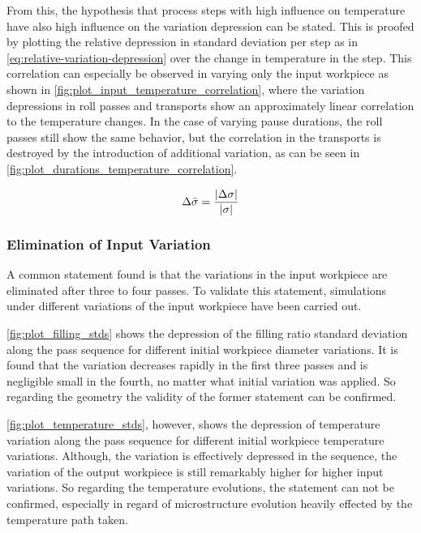 From this, the hypothesis that process steps with high influence on temperature have also high influence on the variation depression can be stated.
This is proofed by plotting the relative depression in standard deviation per step as in \autoref{eq:relative-variation-depression} over the change in temperature in the step.
This correlation can especially be observed in varying only the input workpiece as shown in \autoref{fig:plot_input_temperature_correlation}, where the variation depressions in roll passes and transports show an approximately linear correlation to the temperature changes.
In the case of varying pause durations, the roll passes still show the same behavior, but the correlation in the transports is destroyed by the introduction of additional variation, as can be seen in \autoref{fig:plot_durations_temperature_correlation}.

\begin{equation}
    {\Delta\bar{\sigma}} = \frac{{\lvert {\Delta {\sigma}} \rvert}}{{\lvert {\sigma} \rvert}}
    \label{eq:relative-variation-depression}
\end{equation}


\subsubsection{Elimination of Input Variation}\label{subsubsec:elimination-of-input-variation}

A common statement found is that the variations in the input workpiece are eliminated after three to four passes.
To validate this statement, simulations under different variations of the input workpiece have been carried out.

\autoref{fig:plot_filling_stds} shows the depression of the filling ratio standard deviation along the pass sequence for different initial workpiece diameter variations.
It is found that the variation decreases rapidly in the first three passes and is negligible small in the fourth, no matter what initial variation was applied.
So regarding the geometry the validity of the former statement can be confirmed.

\autoref{fig:plot_temperature_stds}, however, shows the depression of temperature variation along the pass sequence for different initial workpiece temperature variations.
Although, the variation is effectively depressed in the sequence, the variation of the output workpiece is still remarkably higher for higher input variations.
So regarding the temperature evolutions, the statement can not be confirmed, especially in regard of microstructure evolution heavily effected by the temperature path taken.

